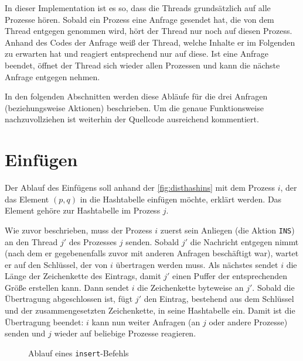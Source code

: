 \documentclass{scrreprt}
\begin{document}
In dieser Implementation ist es so, dass die Threads grundsätzlich auf alle Prozesse hören. Sobald ein Prozess eine Anfrage gesendet hat, die von dem Thread entgegen genommen wird, hört der Thread nur noch auf diesen Prozess. Anhand des Codes der Anfrage weiß der Thread, welche Inhalte er im Folgenden zu erwarten hat und reagiert entsprechend nur auf diese. Ist eine Anfrage beendet, öffnet der Thread sich wieder allen Prozessen und kann die nächste Anfrage entgegen nehmen.

In den folgenden Abschnitten werden diese Abläufe für die drei Anfragen (beziehungsweise Aktionen) beschrieben. Um die genaue Funktionsweise nachzuvollziehen ist weiterhin der Quellcode ausreichend kommentiert.

\section{Einfügen}

Der Ablauf des Einfügens soll anhand der \autoref{fig:disthashins} mit dem Prozess $i$, der das Element $(p,q)$ in die Hashtabelle einfügen möchte,  erklärt werden. Das Element gehöre zur Hashtabelle im Prozess $j$.

Wie zuvor beschrieben, muss der Prozess $i$ zuerst sein Anliegen (die Aktion \lstinline`INS`) an den Thread $j'$ des Prozesses $j$ senden. Sobald $j'$ die Nachricht entgegen nimmt (nach dem er gegebenenfalls zuvor mit anderen Anfragen beschäftigt war), wartet er auf den Schlüssel, der von $i$ übertragen werden muss. Als nächstes sendet $i$ die Länge der Zeichenkette des Eintrags, damit $j'$ einen Puffer der entsprechenden Größe erstellen kann. Dann sendet $i$ die Zeichenkette byteweise an $j'$. Sobald die Übertragung abgeschlossen ist, fügt $j'$ den Eintrag, bestehend aus dem Schlüssel und der zusammengesetzten Zeichenkette, in seine Hashtabelle ein. Damit ist die Übertragung beendet: $i$ kann nun weiter Anfragen (an $j$ oder andere Prozesse) senden und $j$ wieder auf beliebige Prozesse reagieren.
\begin{figure}[!ht]
\centering
{}
\caption{Ablauf eines \lstinline`insert`-Befehls}
\label{fig:disthashins}
\end{figure}
\end{document}
